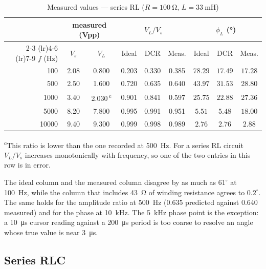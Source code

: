 \documentclass[11pt]{article}
\begin{document}
\begin{table}[H]
    \centering
    \caption{Measured values --- series RL ($R = \SI{100}{\ohm}$, $L = \SI{33}{\milli\henry}$)}
    \small
    \begin{tabular}{rcccccccc}
        \toprule
        & \multicolumn{2}{c}{measured (Vpp)} & \multicolumn{3}{c}{$V_L / V_s$}
        & \multicolumn{3}{c}{$\phi_L$ (\si{\degree})} \\
        \cmidrule(lr){2-3} \cmidrule(lr){4-6} \cmidrule(lr){7-9}
        $f$ (Hz) & $V_s$ & $V_L$ & Ideal & DCR & Meas. & Ideal & DCR & Meas. \\
        \midrule
        100   & 2.08 & 0.800 & 0.203 & 0.330 & 0.385 & $78.29$ & $17.49$ & $17.28$ \\
        500   & 2.50 & 1.600 & 0.720 & 0.635 & 0.640 & $43.97$ & $31.53$ & $28.80$ \\
        1000  & 3.40 & 2.030\,\textsuperscript{c} & 0.901 & 0.841 & 0.597 & $25.75$ & $22.88$ & $27.36$ \\
        5000  & 8.20 & 7.800 & 0.995 & 0.991 & 0.951 & $5.51$  & $5.48$  & $18.00$ \\
        10000 & 9.40 & 9.300 & 0.999 & 0.998 & 0.989 & $2.76$  & $2.76$  & $2.88$  \\
        \bottomrule
    \end{tabular}

    \vspace{0.4em}
    \footnotesize
    \raggedright
    \textsuperscript{c}This ratio is lower than the one recorded at
    \SI{500}{\hertz}. For a series RL circuit $V_L / V_s$ increases monotonically
    with frequency, so one of the two entries in this row is in error.
\end{table}

The ideal column and the measured column disagree by as much as $61^\circ$ at
\SI{100}{\hertz}, while the column that includes \SI{43}{\ohm} of winding
resistance agrees to $0.2^\circ$. The same holds for the amplitude ratio at
\SI{500}{\hertz} (0.635 predicted against 0.640 measured) and for the phase at
\SI{10}{\kilo\hertz}. The \SI{5}{\kilo\hertz} phase point is the exception: a
\SI{10}{\micro\second} cursor reading against a \SI{200}{\micro\second} period is
too coarse to resolve an angle whose true value is near \SI{3}{\micro\second}.

\subsection*{Series RLC}
\end{document}
